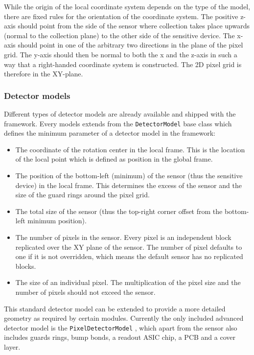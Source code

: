 While the origin of the local coordinate system depends on the type of the model, there are fixed rules for the orientation of the coordinate system. The positive z-axis should point from the side of the sensor where collection takes place upwards (normal to the collection plane) to the other side of the sensitive device. The x-axis should point in one of the arbitrary two directions in the plane of the pixel grid. The y-axis should then be normal to both the x and the z-axis in such a way that a right-handed coordinate system is constructed. The 2D pixel grid is therefore in the XY-plane.

\subsubsection{Detector models}
\label{sec:detector_models}
Different types of detector models are already available and shipped with the framework. Every models extends from the \texttt{DetectorModel} base class which defines the minimum parameter of a detector model in the framework:
\begin{itemize}
\item The coordinate of the rotation center in the local frame. This is the location of the local point which is defined as position in the global frame.
\item The position of the bottom-left (minimum) of the sensor (thus the sensitive device) in the local frame. This determines the excess of the sensor and the size of the guard rings around the pixel grid. 
\item The total size of the sensor (thus the top-right corner offset from the bottom-left minimum position).
\item The number of pixels in the sensor. Every pixel is an independent block replicated over the XY plane of the sensor. The number of pixel defaults to one if it is not overridden, which means the default sensor has no replicated blocks.
\item The size of an individual pixel. The multiplication of the pixel size and the number of pixels should not exceed the sensor.
\end{itemize}

This standard detector model can be extended to provide a more detailed geometry as required by certain modules. Currently the only included advanced detector model is the \texttt{PixelDetectorModel} , which apart from the sensor also includes guards rings, bump bonds, a readout ASIC chip, a PCB and a cover layer. 

